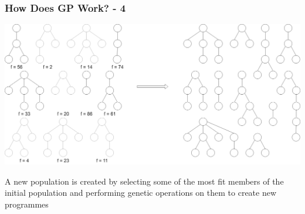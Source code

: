 \documentclass{beamer}
\begin{document}
		\begin{frame}
		
			\frametitle{How Does GP Work? - 4}
			
			\begin{center}
			
				\includegraphics[scale=0.15]{resources/4_gp_example_selection}
				
				A new population is created by selecting some of the most fit members of the initial population and performing genetic operations on them to create new programmes
				
			\end{center}
		
		\end{frame}
	
\end{document}
